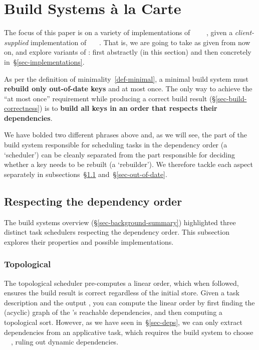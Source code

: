 \section{Build Systems \`a la Carte}\label{sec-build}

The focus of this paper is on a variety of implementations of
~~~~, given
a \emph{client-supplied} implementation of ~~~. That
is, we are going to take  as given from now on, and explore variants of
: first abstractly (in this section) and then concretely
in~\S\ref{sec-implementations}.

As per the definition of minimality~\ref{def-minimal}, a minimal build
system must \textbf{rebuild only out-of-date keys} and at most once. The only
way to achieve the ``at most once'' requirement while producing a correct build
result (\S\ref{sec-build-correctness}) is to \textbf{build all keys in an
order that respects their dependencies}.

\vspace{1mm}
We have bolded two different phrases above and, as we will see, the part of the
build system responsible for scheduling tasks in the dependency order
(a `scheduler') can be cleanly separated from the part responsible for deciding
whether a key needs to be rebuilt (a `rebuilder'). We therefore tackle each
aspect separately in subsections~\S\ref{sec-dependency-orderings}
and~\S\ref{sec-out-of-date}.

\subsection{Respecting the dependency order}
\label{sec-dependency-orderings}

The build systems overview (\S\ref{sec-background-summary}) highlighted three
distinct task schedulers respecting the dependency order. This subsection
explores their properties and possible implementations.

\vspace{-2mm}
\subsubsection{Topological}\label{sec-topological}

The topological scheduler pre-computes a linear order, which when followed,
ensures the build result is correct regardless of the initial store. Given a
task description and the output , you can compute the linear order by
first finding the (acyclic) graph of the 's reachable dependencies, and
then computing a topological sort. However, as we have seen in~\S\ref{sec-deps},
we can only extract dependencies from an applicative task, which requires the
build system to choose ~\hs{=}~, ruling out dynamic
dependencies.


